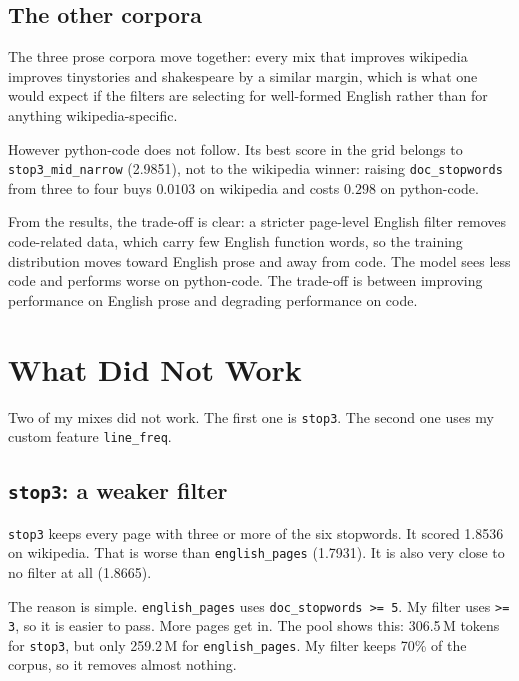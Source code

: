 \documentclass[10pt]{article}
\begin{document}
\subsection*{The other corpora}

The three prose corpora move together: every mix that improves wikipedia
improves tinystories and shakespeare by a similar margin, which is what
one would expect if the filters are selecting for well-formed English
rather than for anything wikipedia-specific.

However python-code does not follow. Its best score in the grid belongs to
\texttt{stop3\_mid\_narrow} (2.9851), not to the wikipedia winner:
raising \texttt{doc\_stopwords} from three to four buys $0.0103$ on
wikipedia and costs $0.298$ on python-code.

From the results, the trade-off is clear: a stricter page-level English filter
removes code-related data, which carry few English function words, so the training
distribution moves toward English prose and away from code. The model
sees less code and performs worse on python-code. The trade-off is between
improving performance on English prose and degrading performance on code.



\section{What Did Not Work}

Two of my mixes did not work. The first one is \texttt{stop3}. The
second one uses my custom feature \texttt{line\_freq}.

\subsection*{\texttt{stop3}: a weaker filter}

\texttt{stop3} keeps every page with three or more of the six stopwords.
It scored 1.8536 on wikipedia. That is worse than
\texttt{english\_pages} (1.7931). It is also very close to no filter at
all (1.8665).

The reason is simple. \texttt{english\_pages} uses
\texttt{doc\_stopwords >= 5}. My filter uses \texttt{>= 3}, so it is
easier to pass. More pages get in. The pool shows this: 306.5\,M tokens
for \texttt{stop3}, but only 259.2\,M for \texttt{english\_pages}. My
filter keeps 70\% of the corpus, so it removes almost nothing.
\end{document}

